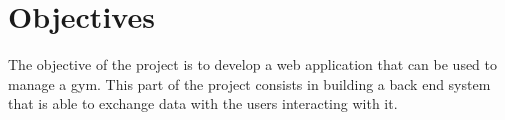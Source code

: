 \section{Objectives}


The objective of the project is to develop a web application that can be used to manage a gym. This part of the project consists in building a back end system that is able to exchange data with the users interacting with it.